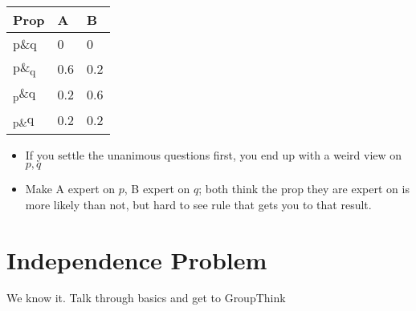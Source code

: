 \begin{table}[htbp]
\begin{minipage}{\linewidth}
\setlength{\tymax}{0.5\linewidth}
\centering
\small
\begin{tabulary}{\textwidth}{@{}lll@{}} \toprule
 Prop & A & B \\
\midrule

 p\&q & 0 & 0 \\
 p\&\textsubscript{q} & 0.6 & 0.2 \\
 \textsubscript{p}\&q & 0.2 & 0.6 \\
 \textsubscript{p\&}q& 0.2 & 0.2 \\
\bottomrule

\end{tabulary}
\end{minipage}
\end{table}

\begin{itemize}
\item{} If you settle the unanimous questions first, you end up with a weird view on $p, q$

\item{} Make A expert on $p$, B expert on $q$; both think the prop they are expert on is more likely than not, but hard to see rule that gets you to that result.

\end{itemize}
\section{Independence Problem}
\label{independenceproblem}

We know it. Talk through basics and get to GroupThink


